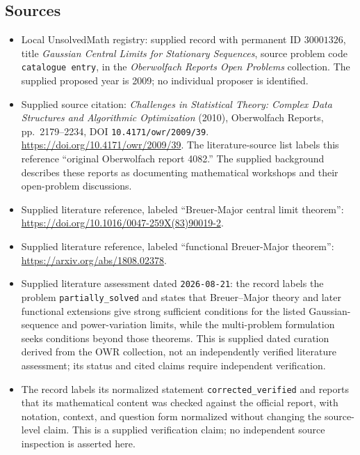 \documentclass[11pt]{article}
\begin{document}
\subsection{Sources}
\begin{itemize}
\item Local UnsolvedMath registry: supplied record with permanent ID \(30001326\), title \emph{Gaussian Central Limits for Stationary Sequences}, source problem code \texttt{catalogue entry}, in the \emph{Oberwolfach Reports Open Problems} collection. The supplied proposed year is 2009; no individual proposer is identified.
\item Supplied source citation: \emph{Challenges in Statistical Theory: Complex Data Structures and Algorithmic Optimization} (2010), Oberwolfach Reports, pp.~2179--2234, DOI \texttt{10.4171/owr/2009/39}. \url{https://doi.org/10.4171/owr/2009/39}. The literature-source list labels this reference ``original Oberwolfach report 4082.'' The supplied background describes these reports as documenting mathematical workshops and their open-problem discussions.
\item Supplied literature reference, labeled ``Breuer-Major central limit theorem'': \url{https://doi.org/10.1016/0047-259X(83)90019-2}.
\item Supplied literature reference, labeled ``functional Breuer-Major theorem'': \url{https://arxiv.org/abs/1808.02378}.
\item Supplied literature assessment dated \texttt{2026-08-21}: the record labels the problem \texttt{partially\_solved} and states that Breuer--Major theory and later functional extensions give strong sufficient conditions for the listed Gaussian-sequence and power-variation limits, while the multi-problem formulation seeks conditions beyond those theorems. This is supplied dated curation derived from the OWR collection, not an independently verified literature assessment; its status and cited claims require independent verification.
\item The record labels its normalized statement \texttt{corrected\_verified} and reports that its mathematical content was checked against the official report, with notation, context, and question form normalized without changing the source-level claim. This is a supplied verification claim; no independent source inspection is asserted here.
\end{itemize}
\end{document}
